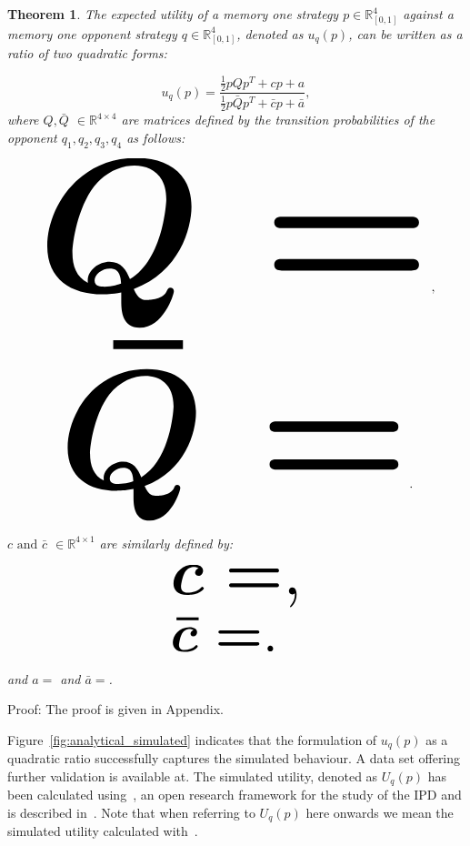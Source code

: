 \documentclass[10pt]{article}
\newcommand{\R}{\mathbb{R}}
\newtheorem{theorem}{Theorem}
\begin{document}
\begin{theorem}\label{theorem:quadratic_form_u}
    The expected utility of a memory one strategy \(p\in\mathbb{R}_{[0,1]}^4\)
    against a memory one opponent strategy \(q\in\mathbb{R}_{[0,1]}^4\), denoted
    as \(u_q(p)\), can be written as a ratio of two quadratic forms:

    \begin{equation}\label{eq:optimisation_quadratic}
    u_q(p) = \frac{\frac{1}{2}pQp^T + cp + a}
                {\frac{1}{2}p\bar{Q}p^T + \bar{c}p + \bar{a}},
    \end{equation}
    where \(Q, \bar{Q}\) \(\in \R^{4\times4}\) are matrices defined by the
    transition probabilities of the opponent \(q_1, q_2, q_3, q_4\) as follows:

    \begin{center}
    \begin{equation}
    \resizebox{0.9\linewidth}{!}{\arraycolsep=2.5pt%
    \boldmath\(
    Q = \)},
    \end{equation}
    \begin{equation}\label{eq:q_bar_matrix}
    \resizebox{0.8\linewidth}{!}{\arraycolsep=2.5pt%
    \boldmath\(
    \bar{Q} =  \)}.
    \end{equation}
    \end{center}

    \(c \text{ and } \bar{c}\) \(\in \R^{4 \times 1}\) are similarly defined by:

    \begin{equation}\label{eq:q_matrix_numerator}
    \resizebox{0.3\linewidth}{!}{\arraycolsep=2.5pt%
    \boldmath\(c = \),}
    \end{equation}
    \begin{equation}\label{eq:q_matrix_denominator}
    \resizebox{0.3\linewidth}{!}{\arraycolsep=2.5pt%
    \boldmath\(\bar{c} = \).
    }
    \end{equation}

    and \(a = \) and
    \(\bar{a} = \).
\end{theorem}

Proof: The proof is given in Appendix. %

Figure~\ref{fig:analytical_simulated} indicates that the formulation of \(u_q(p)\)
as a quadratic ratio successfully captures the simulated behaviour. A data set
offering further validation is available at. %
The simulated utility, denoted
as \(U_q(p)\) has been calculated using~\cite{axelrodproject},  an open research
framework for the study of the IPD and is described in~\cite{Knight2016}. Note that
when referring to \(U_q(p)\) here onwards we mean the simulated utility calculated
with~\cite{axelrodproject}.
\end{document}
